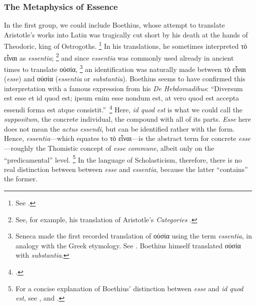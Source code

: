 \subsubsection{The Metaphysics of Essence}

In the first group, we could include Boethius, whose attempt to translate Aristotle’s works into Latin was tragically cut short by his death at the hands of Theodoric, king of Ostrogoths.%
\footnote{See \cite[458]{fabro:intensive}.}
%
In his translations, he sometimes interpreted τὸ εἶναι as \emph{essentia};%
%
\footnote{See, for example, his translation of Aristotle’s \emph{Categories} \parencite[285D–286C {[=Μ, 14b10–25 in Aristotle]}]{boethius:categories}.}
%
and since \emph{essentia} was commonly used already in ancient times to translate οὐσία,%
%
\footnote{Seneca made the first recorded translation of οὐσία using the term \emph{essentia}, in analogy with the Greek etymology. See \cite[339-340]{gilson:letre}. Boethius himself translated οὐσία with \emph{substantia}.} an identification was naturally made between τὸ εἶναι (\emph{esse}) and οὐσία (\emph{essentia} or \emph{substantia}). Boethius seems to have confirmed this interpretation with a famous expression from his \emph{De Hebdomadibus}: “Diversum est esse et id quod est; ipsum enim esse nondum est, at vero quod est accepta essendi forma est atque consistit.”\,%
\footcite[1311B]{boethius:dehebodmadibus}
Here, \emph{id quod est} is what we could call the \emph{suppositum}, the concrete individual, the compound with all of its parts. \emph{Esse} here does not mean the \emph{actus essendi}, but can be identified rather with the form. Hence, \emph{essentia}—which equates to τὸ εἶναι—is the abstract term for concrete \emph{esse}—roughly the Thomistic concept of \emph{esse commune}, albeit only on the “predicamental” level.%
%
\footnote{For a concise explanation of Boethius’ distinction between \emph{esse} and \emph{id quod est}, see \cite[105]{gilson:history}, and \cite[83–85]{definance:etre-et-agir}.}  In the language of Scholasticism, therefore, there is no real distinction between between \emph{esse} and \emph{essentia}, because the latter “contains” the former.

